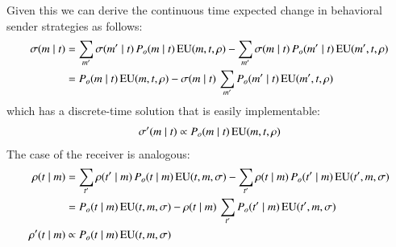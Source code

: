 \documentclass[fleqn,reqno,11pt]{article}
\begin{document}
Given this we can derive the continuous time expected change in behavioral sender strategies as
follows:
\begin{align*}
  \sigma(m \mid t) & = \sum_{m'} \sigma(m' \mid t) \thinspace
  P_o(m \mid t) \thinspace \mathrm{EU}(m, t, \rho) - \sum_{m'} \sigma(m \mid t) \thinspace
  P_o(m' \mid t) \thinspace \mathrm{EU}(m', t, \rho) \\
  & = P_o(m \mid t) \thinspace \mathrm{EU}(m, t, \rho) - \sigma(m \mid t) \thinspace \sum_{m'} 
  P_o(m' \mid t) \thinspace \mathrm{EU}(m', t, \rho)
\end{align*}
which has a discrete-time solution that is easily implementable:
\begin{align*}
  \sigma'(m \mid t) \propto P_o(m \mid t) \thinspace \mathrm{EU}(m,
  t, \rho)
\end{align*}
The case of the receiver is analogous:
\begin{align*}
  \rho(t \mid m) & = \sum_{t'} \rho(t' \mid m) \thinspace
  P_o(t \mid m) \thinspace \mathrm{EU}(t, m, \sigma) - \sum_{t'} \rho(t \mid m) \thinspace
  P_o(t' \mid m) \thinspace \mathrm{EU}(t', m, \sigma) \\
  & = P_o(t \mid m) \thinspace \mathrm{EU}(t, m, \sigma) - \rho(t \mid m) \thinspace \sum_{t'} 
  P_o(t' \mid m) \thinspace \mathrm{EU}(t', m, \sigma)\\
  \rho'(t \mid m) & \propto P_o(t \mid m) \thinspace \mathrm{EU}(t,
  m, \sigma)
\end{align*}



\printbibliography[heading=bibintoc]
\end{document}
